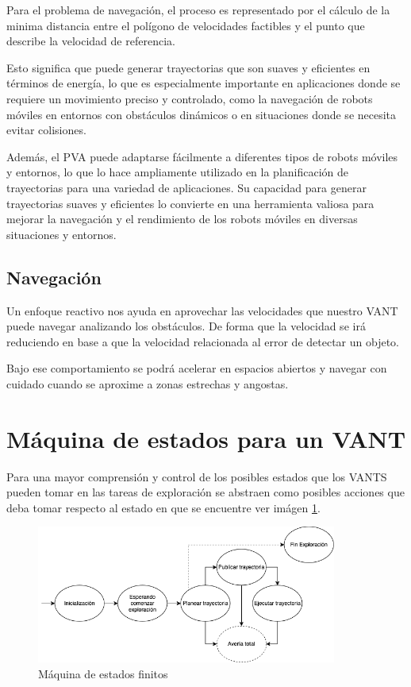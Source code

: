 Para el problema de navegación, el proceso es representado por el cálculo de la minima distancia entre el polígono de velocidades factibles y el punto que describe la velocidad de referencia.

Esto significa que puede generar trayectorias que son suaves y eficientes en términos de energía, lo que es especialmente importante en aplicaciones donde se requiere un movimiento preciso y controlado, como la navegación de robots móviles en entornos con obstáculos dinámicos o en situaciones donde se necesita evitar colisiones.

Además, el PVA puede adaptarse fácilmente a diferentes tipos de robots móviles y entornos, lo que lo hace ampliamente utilizado en la planificación de trayectorias para una variedad de aplicaciones. Su capacidad para generar trayectorias suaves y eficientes lo convierte en una herramienta valiosa para mejorar la navegación y el rendimiento de los robots móviles en diversas situaciones y entornos.

\subsection*{Navegación}
Un enfoque reactivo nos ayuda en aprovechar las velocidades que nuestro VANT puede navegar analizando los obstáculos. De forma que la velocidad se irá reduciendo en base a que la velocidad relacionada al error de detectar un objeto.

Bajo ese comportamiento se podrá acelerar en espacios abiertos y navegar con cuidado cuando se aproxime a zonas estrechas y angostas.

\section{Máquina de estados para un VANT}

Para una mayor comprensión y control de los posibles estados que los VANTS pueden tomar en las tareas de exploración se abstraen como posibles acciones que deba tomar respecto al estado en que se encuentre ver imágen \ref{fig:estado}.

\begin{figure}[h]
\centering
\includegraphics[width=0.88\textwidth]{images/estado}
\caption{Máquina de estados finitos}
\label{fig:estado}
\end{figure}

